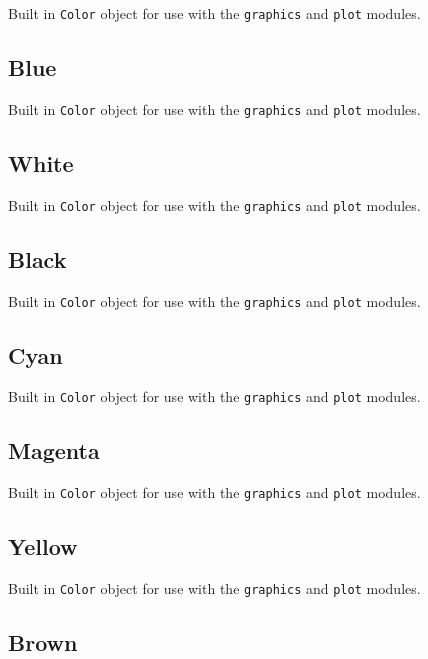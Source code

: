 Built in \texttt{Color} object for use with the \texttt{graphics} and
\texttt{plot} modules.

\hypertarget{blue}{%
\subsection{Blue}\label{blue}}

Built in \texttt{Color} object for use with the \texttt{graphics} and
\texttt{plot} modules.

\hypertarget{white}{%
\subsection{White}\label{white}}

Built in \texttt{Color} object for use with the \texttt{graphics} and
\texttt{plot} modules.

\hypertarget{black}{%
\subsection{Black}\label{black}}

Built in \texttt{Color} object for use with the \texttt{graphics} and
\texttt{plot} modules.

\hypertarget{cyan}{%
\subsection{Cyan}\label{cyan}}

Built in \texttt{Color} object for use with the \texttt{graphics} and
\texttt{plot} modules.

\hypertarget{magenta}{%
\subsection{Magenta}\label{magenta}}

Built in \texttt{Color} object for use with the \texttt{graphics} and
\texttt{plot} modules.

\hypertarget{yellow}{%
\subsection{Yellow}\label{yellow}}

Built in \texttt{Color} object for use with the \texttt{graphics} and
\texttt{plot} modules.

\hypertarget{brown}{%
\subsection{Brown}\label{brown}}

